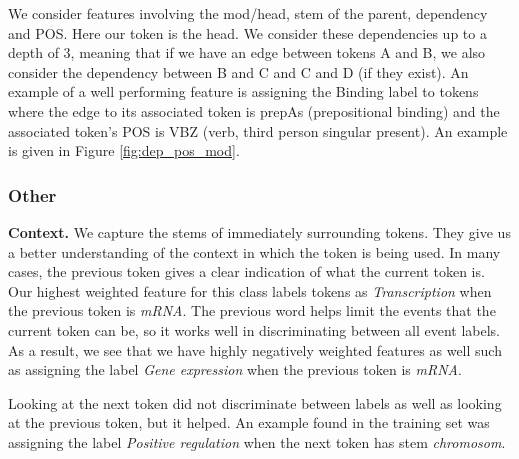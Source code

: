 \documentclass{article} %
\begin{document}
We consider features involving the mod/head, stem of the parent, dependency and POS. Here our token is the head. We consider these dependencies up to a depth of 3, meaning that if we have an edge between tokens A and B, we also consider the dependency between B and C and C and D (if they exist). An example of a well performing feature is assigning the Binding label to tokens where the edge to its associated token is prepAs (prepositional binding) and the associated token's POS is VBZ (verb, third person singular present). An example is given in Figure \ref{fig:dep_pos_mod}.

\subsubsection{Other}

\textbf{Context.} \cite{1} We capture the stems of immediately surrounding tokens. They give us a better understanding of the context in which the token is being used. In many cases, the previous token gives a clear indication of what the current token is. Our highest weighted feature for this class labels tokens as \emph{Transcription} when the previous token is \emph{mRNA}. The previous word helps limit the events that the current token can be, so it works well in discriminating between all event labels. As a result, we see that we have highly negatively weighted features as well such as assigning the label \emph{Gene expression} when the previous token is \emph{mRNA}.

Looking at the next token did not discriminate between labels as well as looking at the previous token, but it helped. An example found in the training set was assigning the label \emph{Positive regulation} when the next token has stem \emph{chromosom}.
\end{document}

